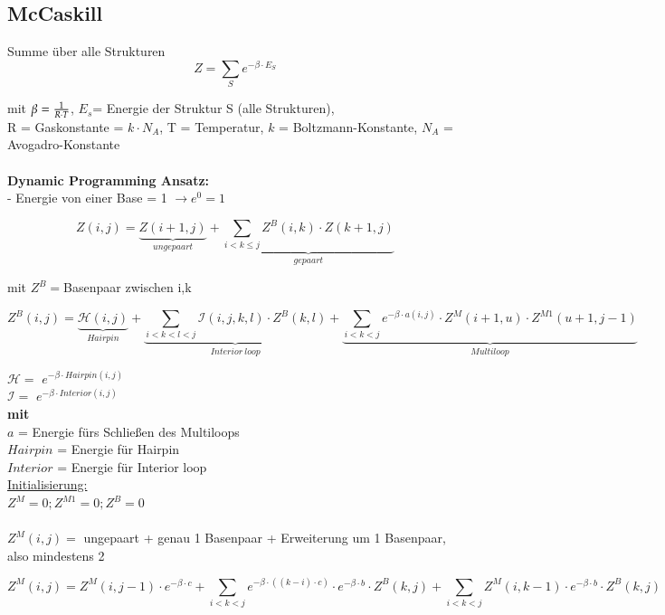 \subsection{McCaskill}

Summe über alle Strukturen 
\begin{equation}
	Z=\sum\limits_{S} e^{-\beta \cdot E_{S}}
\end{equation}

mit $\beta= {1 \over {R \cdot T}}$, $E_{s}$= Energie der Struktur S (alle Strukturen),\\ R = Gaskonstante = $k \cdot N_{A}$, T = Temperatur, $k$ = Boltzmann-Konstante, $N_A$ = Avogadro-Konstante
\\\\
\textbf{Dynamic Programming Ansatz:}\\
 - Energie von einer Base = 1 $\rightarrow e^0=1$

\begin{equation}
	Z(i,j)= \underbrace{Z(i+1,j)}_{ungepaart} + \underbrace{\sum\limits_{i < k \leq j} Z^{B}(i,k) \cdot Z(k+1,j)}_{gepaart}
\end{equation}

mit $Z^B=$Basenpaar zwischen i,k

\begin{equation}
Z^B(i,j)= \underbrace{\mathcal{H}(i,j)}_{Hairpin} + \underbrace{\sum\limits_{i < k < l < j} \mathcal{I}(i,j, k, l) \cdot Z^B(k,l)}_{Interior~loop} +  \underbrace{\sum\limits_{i < k < j} e^{-\beta \cdot {a(i,j)}} \cdot Z^M(i+1,u) \cdot Z^{M1}(u+1,j-1)}_{Multiloop}
\end{equation}

$\mathcal{H}=$ $e^{-\beta \cdot Hairpin(i,j)}$\\
$\mathcal{I}=$ $e^{-\beta \cdot Interior(i,j)}$\\
\textbf{mit}\\
$a$ = Energie fürs Schließen des Multiloops\\
$Hairpin$ = Energie für Hairpin\\
$Interior$ = Energie für Interior loop\\


\underline{Initialisierung:}\\
$Z^M=0; Z^{M1}=0; Z^B=0$
\\\\
$Z^M(i,j) =$ ungepaart + genau 1 Basenpaar + Erweiterung um 1 Basenpaar, also mindestens 2

\begin{equation}
	Z^M(i,j) = Z^M(i,j-1) \cdot e^{-\beta \cdot c} + \sum\limits_{i < k < j} e^{-\beta \cdot ((k-i) \cdot c)} \cdot e^{-\beta \cdot b} \cdot Z^B(k,j) + \sum\limits_{i < k < j} Z^M(i,k-1) \cdot e^{-\beta \cdot b} \cdot Z^B(k,j)
\end{equation}

